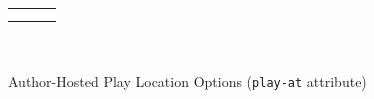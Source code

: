 \documentclass[10pt,]{article}
\theoremstyle{plain}
\theoremstyle{definition}
\theoremstyle{definition}
\theoremstyle{definition}
\theoremstyle{definition}
\theoremstyle{definition}
\theoremstyle{definition}
\numberwithin{equation}{section}
\newlength{\panelmax}
\begin{document}
\begin{figure}
\centering
{%
\setlength{\panelmax}{0pt}
\ifdefined\panelboxAvideo\else\newsavebox{\panelboxAvideo}\fi%
\savebox{\panelboxAvideo}{%
\parbox{70pt}{[video]}}
\ifdefined\phAvideo\else\newlength{\phAvideo}\fi%
\setlength{\phAvideo}{\ht\panelboxAvideo+\dp\panelboxAvideo}
\settototalheight{\phAvideo}{\usebox{\panelboxAvideo}}
\setlength{\panelmax}{\maxof{\panelmax}{\phAvideo}}
\ifdefined\panelboxBvideo\else\newsavebox{\panelboxBvideo}\fi%
\savebox{\panelboxBvideo}{%
\parbox{70pt}{[video]}}
\ifdefined\phBvideo\else\newlength{\phBvideo}\fi%
\setlength{\phBvideo}{\ht\panelboxBvideo+\dp\panelboxBvideo}
\settototalheight{\phBvideo}{\usebox{\panelboxBvideo}}
\setlength{\panelmax}{\maxof{\panelmax}{\phBvideo}}
\ifdefined\panelboxCvideo\else\newsavebox{\panelboxCvideo}\fi%
\savebox{\panelboxCvideo}{%
\parbox{70pt}{[video]}}
\ifdefined\phCvideo\else\newlength{\phCvideo}\fi%
\setlength{\phCvideo}{\ht\panelboxCvideo+\dp\panelboxCvideo}
\settototalheight{\phCvideo}{\usebox{\panelboxCvideo}}
\setlength{\panelmax}{\maxof{\panelmax}{\phCvideo}}
\leavevmode%
\setlength{\tabcolsep}{0.025\linewidth}
\par\medskip\noindent
\begin{tabular}{@{}*{3}{c}@{}}
\begin{minipage}[c][\panelmax][t]{0.3\linewidth}\usebox{\panelboxAvideo}\end{minipage}&
\begin{minipage}[c][\panelmax][t]{0.3\linewidth}\usebox{\panelboxBvideo}\end{minipage}&
\begin{minipage}[c][\panelmax][t]{0.3\linewidth}\usebox{\panelboxCvideo}\end{minipage}\tabularnewline
\parbox[t]{0.3\linewidth}{
}&
\parbox[t]{0.3\linewidth}{
}&
\parbox[t]{0.3\linewidth}{
}\end{tabular}\\
}%
\caption{Author-Hosted Play Location Options (\lstinline?play-at? attribute)\label{figure-40}}
\end{figure}
\end{document}
